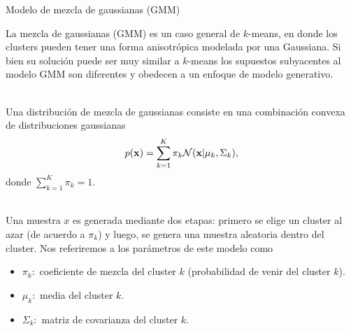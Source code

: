 \documentclass[handout, 9pt]{beamer}
\begin{document}
\begin{frame}{Modelo de mezcla de gaussianas (GMM)}

La mezcla de gaussianas (GMM) es un caso general de $k$-means, en donde los clusters pueden tener una forma anisotrópica modelada por una Gaussiana. Si bien su solución puede ser muy similar a $k$-means los supuestos subyacentes al modelo GMM son diferentes y obedecen a un enfoque de modelo generativo. \\~\ \pause

Una distribución de mezcla de gaussianas consiste en una combinación convexa de distribuciones gaussianas
\begin{equation*}
	p(\mathbf{x}) = \sum_{k=1}^K \pi_k \mathcal{N}(\mathbf{x}| \mu_k,\Sigma_k),
\end{equation*}
donde $\sum_{k=1}^K \pi_k = 1$. \\~\

Una muestra $x$ es generada mediante dos etapas: primero se elige un cluster al azar (de acuerdo a $\pi_k$) y luego, se genera una muestra aleatoria dentro del cluster. \pause Nos referiremos a los parámetros de este modelo como 

\begin{itemize}
	\item $\pi_k:$ coeficiente de mezcla del cluster  $k$ (probabilidad de venir del cluster $k$).
	\item $\mu_k:$ media del cluster  $k$.
	\item $\Sigma_k:$ matriz de covarianza del cluster  $k$.
\end{itemize}

\end{frame}
\end{document}
